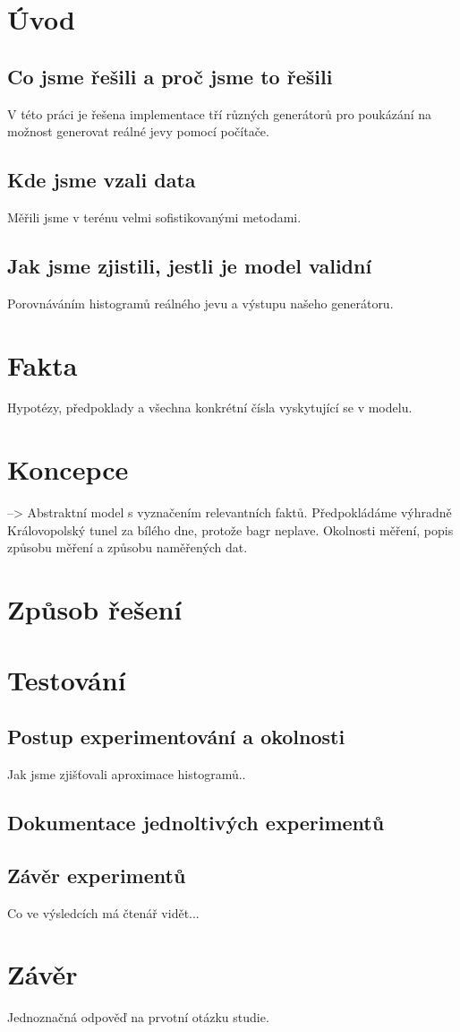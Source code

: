 \documentclass[11pt,a4paper]{article}
\begin{document}
\tableofcontents
\clearpage

\section{Úvod}
	\subsection{Co jsme řešili a proč jsme to řešili}
	V této práci je řešena implementace tří různých generátorů pro poukázání na možnost
	generovat reálné jevy pomocí počítače.
	\subsection{Kde jsme vzali data}
	Měřili jsme v terénu velmi sofistikovanými metodami.
	\subsection{Jak jsme zjistili, jestli je model validní}
	Porovnáváním histogramů reálného jevu a výstupu našeho generátoru.
\section{Fakta}
Hypotézy, předpoklady a všechna konkrétní čísla vyskytující se v modelu.
\section{Koncepce}
--> Abstraktní model s vyznačením relevantních faktů.
Předpokládáme výhradně Královopolský tunel za bílého dne, protože bagr neplave.
Okolnosti měření, popis způsobu měření a způsobu naměřených dat.
\section{Způsob řešení}
\section{Testování}
	\subsection{Postup experimentování a okolnosti}
	Jak jsme zjišťovali aproximace histogramů..
	\subsection{Dokumentace jednoltivých experimentů}
	\subsection{Závěr experimentů}
	Co ve výsledcích má čtenář vidět...
\section{Závěr}
Jednoznačná odpověď na prvotní otázku studie.
\end{document}
